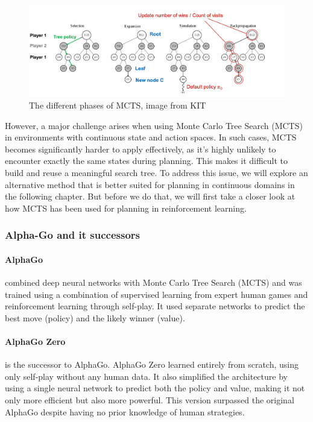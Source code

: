 \begin{figure}[H]
    \centering
    \includegraphics[width=\linewidth]{images/MCTS.png}
    \caption{The different phases of MCTS, image from KIT }
    \label{fig:MCTS}
\end{figure}
However, a major challenge arises when using Monte Carlo Tree Search (MCTS) in environments with continuous state and action spaces. In such 
cases, MCTS becomes significantly harder to apply effectively, as it's highly unlikely to encounter exactly the same states during planning.
This makes it difficult to build and reuse a meaningful search tree. To address this issue, we will explore an alternative method that is 
better suited for planning in continuous domains in the following chapter. But before we do that, we will first take a closer look at how 
MCTS has been used for planning in reinforcement learning.

\subsubsection{Alpha-Go and it successors}
\paragraph{AlphaGo} combined deep neural networks with Monte Carlo Tree Search (MCTS) and was trained using a combination of supervised 
learning from expert human games and reinforcement learning through self-play. It used separate networks to predict the best move (policy) 
and the likely winner (value).
\paragraph{AlphaGo Zero} is the successor to AlphaGo. AlphaGo Zero learned entirely from scratch, using only self-play without any human 
data. It also simplified the architecture by using a single neural network to predict both the policy and value, making it not only more 
efficient but also more powerful. This version surpassed the original AlphaGo despite having no prior knowledge of human strategies. 
